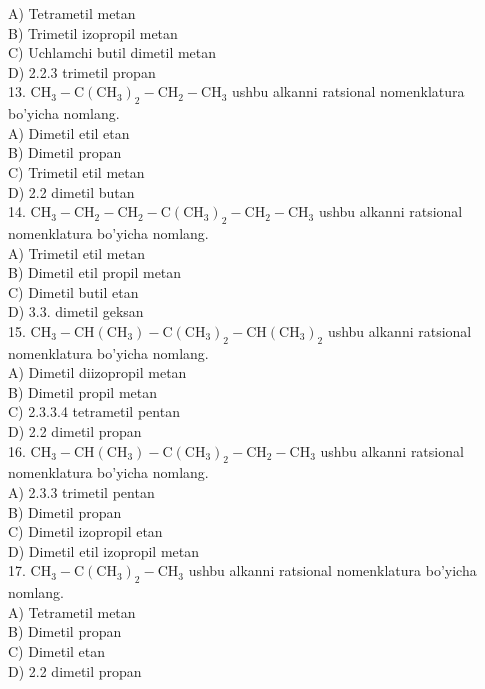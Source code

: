 A) Tetrametil metan\\
B) Trimetil izopropil metan\\
C) Uchlamchi butil dimetil metan\\
D) 2.2.3 trimetil propan\\
13. $\mathrm{CH}_{3}-\mathrm{C}\left(\mathrm{CH}_{3}\right)_{2}-\mathrm{CH}_{2}-\mathrm{CH}_{3}$ ushbu alkanni ratsional nomenklatura bo'yicha nomlang.\\
A) Dimetil etil etan\\
B) Dimetil propan\\
C) Trimetil etil metan\\
D) 2.2 dimetil butan\\
14. $\mathrm{CH}_{3}-\mathrm{CH}_{2}-\mathrm{CH}_{2}-\mathrm{C}\left(\mathrm{CH}_{3}\right)_{2}-\mathrm{CH}_{2}-\mathrm{CH}_{3}$ ushbu alkanni ratsional nomenklatura bo'yicha nomlang.\\
A) Trimetil etil metan\\
B) Dimetil etil propil metan\\
C) Dimetil butil etan\\
D) 3.3. dimetil geksan\\
15. $\mathrm{CH}_{3}-\mathrm{CH}\left(\mathrm{CH}_{3}\right)-\mathrm{C}\left(\mathrm{CH}_{3}\right)_{2}-\mathrm{CH}\left(\mathrm{CH}_{3}\right)_{2}$ ushbu alkanni ratsional nomenklatura bo'yicha nomlang.\\
A) Dimetil diizopropil metan\\
B) Dimetil propil metan\\
C) 2.3.3.4 tetrametil pentan\\
D) 2.2 dimetil propan\\
16. $\mathrm{CH}_{3}-\mathrm{CH}\left(\mathrm{CH}_{3}\right)-\mathrm{C}\left(\mathrm{CH}_{3}\right)_{2}-\mathrm{CH}_{2}-\mathrm{CH}_{3}$ ushbu alkanni ratsional nomenklatura bo'yicha nomlang.\\
A) 2.3.3 trimetil pentan\\
B) Dimetil propan\\
C) Dimetil izopropil etan\\
D) Dimetil etil izopropil metan\\
17. $\mathrm{CH}_{3}-\mathrm{C}\left(\mathrm{CH}_{3}\right)_{2}-\mathrm{CH}_{3}$ ushbu alkanni ratsional nomenklatura bo'yicha nomlang.\\
A) Tetrametil metan\\
B) Dimetil propan\\
C) Dimetil etan\\
D) 2.2 dimetil propan\\
